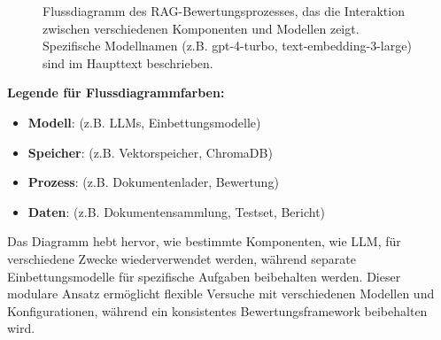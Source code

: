 \begin{figure}[htbp]
{
    }
    \caption{Flussdiagramm des RAG-Bewertungsprozesses, das die Interaktion zwischen verschiedenen Komponenten und Modellen zeigt. Spezifische Modellnamen (z.B. gpt-4-turbo, text-embedding-3-large) sind im Haupttext beschrieben.}
    \label{fig:rag-flow}
\end{figure}

\begin{center}
\begin{minipage}{0.85\textwidth}
\textbf{Legende für Flussdiagrammfarben:}
\begin{itemize}
    \item \colorbox{pink!20}{\strut\hspace{1.5em}} \textbf{Modell}: (z.B. LLMs, Einbettungsmodelle)
    \item \colorbox{blue!20}{\strut\hspace{1.5em}} \textbf{Speicher}: (z.B. Vektorspeicher, ChromaDB)
    \item \colorbox{green!20}{\strut\hspace{1.5em}} \textbf{Prozess}: (z.B. Dokumentenlader, Bewertung)
    \item \colorbox{red!20}{\strut\hspace{1.5em}} \textbf{Daten}: (z.B. Dokumentensammlung, Testset, Bericht)
\end{itemize}
\end{minipage}
\end{center}

Das Diagramm hebt hervor, wie bestimmte Komponenten, wie LLM, für verschiedene Zwecke wiederverwendet werden, während separate Einbettungsmodelle für spezifische Aufgaben beibehalten werden. Dieser modulare Ansatz ermöglicht flexible Versuche mit verschiedenen Modellen und Konfigurationen, während ein konsistentes Bewertungsframework beibehalten wird. 